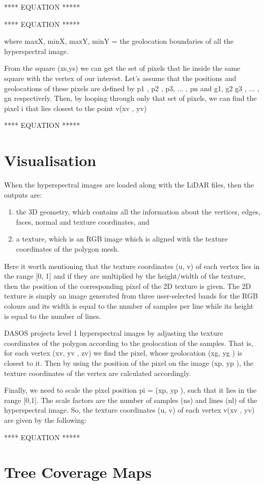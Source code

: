 \documentclass{subfiles}
\begin{document}
	**** EQUATION *****
	
	**** EQUATION *****
	\par where maxX, minX, maxY, minY = the geolocation boundaries of all the hyperspectral image.
	
	\par From the square (xs,ys) we can get the set of pixels that lie inside the same square with the vertex of our interest. Let’s assume that the positions and geolocations of these pixels are defined by p1	, p2 , p3, ... , pn and g1, g2 g3 , ... , gn respectively. Then, by looping through only that set of pixels, we can find the pixel i that lies closest to the point v(xv , yv)
	
	**** EQUATION *****
	

	
	
		
\section{Visualisation}
	\par When the hyperspectral images are loaded along with the LiDAR files, then the outputs are: 	
	\begin{enumerate}
		\item the 3D geometry, which contains all the information about the vertices, edges, faces, normal and texture coordinates, and
		\item  a texture, which is an RGB image which is aligned with the texture coordinates of the polygon mesh.
	\end{enumerate}
	
	\par Here it worth mentioning that the texture coordinates (u, v) of each vertex lies in the range [0, 1] and if they are multiplied by the height/width of the texture, then the position of the corresponding pixel of the 2D texture is given. The 2D texture is simply an image generated from three user-selected bands for the RGB colours and its width is equal to the number of samples per line while its height is equal to the number of lines.
				
					
	\par DASOS projects level 1 hyperspectral images by adjusting the texture coordinates of the polygon according to the geolocation of the samples. That is, for each vertex (xv, yv , zv) we find the pixel, whose geolocation (xg, yg ) is closest to it. Then by using the position of the pixel on the image (xp, yp ), the texture coordinates of the vertex are calculated accordingly.
				
	\par Finally, we need to scale the pixel position pi = (xp, yp ), such that it lies in the range [0,1]. The scale factors are the number of samples (ns) and lines (nl) of the hyperspectral image. So, the texture coordinates (u, v) of each vertex v(xv , yv) are given by the following:
		
		
	**** EQUATION *****
		
		
\section{Tree Coverage Maps}
\end{document}
